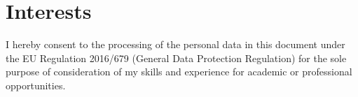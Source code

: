 \documentclass[a4paper, 11pt, sans]{moderncv}
\begin{document}

\renewcommand{\listitemsymbol}{-~} %

\section{Interests}



\vfill
I hereby consent to the processing of the personal data in this document under the EU Regulation 2016/679 (General Data Protection Regulation) for the sole purpose of consideration of my skills and experience for academic or professional opportunities.
\end{document}
